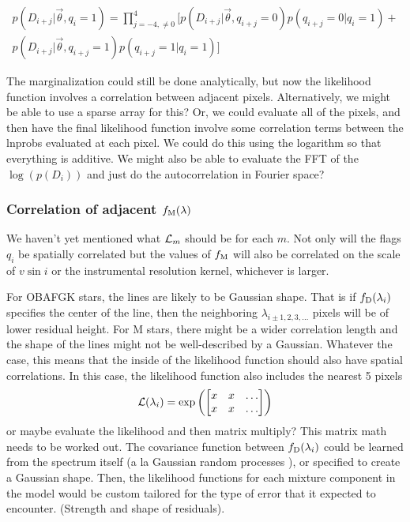 \documentclass[preprint]{aastex} %
\newcommand{\vt}{\vec{\theta}}
\newcommand{\fM}{f_{\rm M}}
\newcommand{\fD}{f_{\rm D}}
\begin{document}
\begin{multline}
  p(D_{i + j} | \vt, q_i = 1) = \prod_{j = -4, \ne 0}^4 \bigl [ p(D_{i+j} | \vt, q_{i +j}=0) p(q_{i+j} = 0 | q_i=1) + \\
    p(D_{i + j} | \vt, q_{i + j} = 1) p(q_{i +j} = 1 | q_i = 1) \bigr ]
\end{multline}

The marginalization could still be done analytically, but now the likelihood function involves a correlation between adjacent pixels. Alternatively, we might be able to use a sparse array for this? Or, we could evaluate all of the pixels, and then have the final likelihood function involve some correlation terms between the lnprobs evaluated at each pixel. We could do this using the logarithm so that everything is additive. We might also be able to evaluate the FFT of the $\log(p(D_i))$ and just do the autocorrelation in Fourier space?

\subsubsection{Correlation of adjacent $\fM(\lambda)$}
We haven't yet mentioned what ${\cal L}_m$ should be for each $m$. Not only will the flags $q_i$ be spatially correlated but the values of $\fM$ will also be correlated on the scale of $v \sin i$ or the instrumental resolution kernel, whichever is larger.

For OBAFGK stars, the lines are likely to be Gaussian shape. That is if $\fD(\lambda_i)$ specifies the center of the line, then the neighboring $\lambda_{i \pm 1,2,3,\ldots}$ pixels will be of lower residual height. For M stars, there might be a wider correlation length and the shape of the lines might not be well-described by a Gaussian. Whatever the case, this means that the inside of the likelihood function should also have spatial correlations. In this case, the likelihood function also includes the nearest 5 pixels
\begin{equation}
  {\cal L}(\lambda_i) = \exp\left ( 
  \begin{bmatrix}
x & x & \dots\\
x & x & \dots\\
  \end{bmatrix}
  \right )
\end{equation}
or maybe evaluate the likelihood and then matrix multiply? This matrix math needs to be worked out. The covariance function between $\fD(\lambda_i)$ could be learned from the spectrum itself (a la Gaussian random processes \citep{rw05}), or specified to create a Gaussian shape. Then, the likelihood functions for each mixture component in the model would be custom tailored for the type of error that it expected to encounter. (Strength and shape of residuals).
\end{document}
